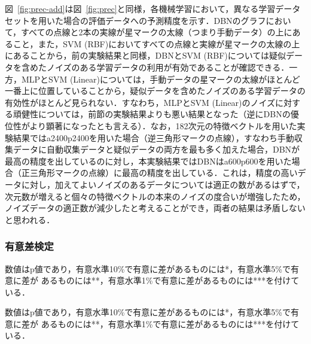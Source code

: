 \documentclass[japanese]{jnlp_1.4}
\begin{document}
図~\ref{fig:prec-add}は図~\ref{fig:prec}と同様，各機械学習において，異なる学習データセットを用いた場合の評価データへの予測精度を示す．DBNのグラフにおいて，すべての点線と2本の実線が星マークの太線（つまり手動データ）の上にあること，また，SVM (RBF)においてすべての点線と実線が星マークの太線の上にあることから，前の実験結果と同様，DBNとSVM (RBF)については疑似データを含めたノイズのある学習データの利用が有効であることが確認できる．一方，MLPとSVM (Linear)については，手動データの星マークの太線がほとんど一番上に位置していることから，疑似データを含めたノイズのある学習データの有効性がほとんど見られない．すなわち，MLPとSVM (Linear)のノイズに対する頑健性については，前節の実験結果よりも悪い結果となった（逆にDBNの優位性がより顕著になったとも言える）．なお，182次元の特徴ベクトルを用いた実験結果ではa2400p2400を用いた場合（逆三角形マークの点線），すなわち手動収集データに自動収集データと疑似データの両方を最も多く加えた場合，DBNが最高の精度を出しているのに対し，本実験結果ではDBNはa600p600を用いた場合（正三角形マークの点線）に最高の精度を出している．これは，精度の高いデータに対し，加えてよいノイズのあるデータについては適正の数があるはずで，次元数が増えると個々の特徴ベクトルの本来のノイズの度合いが増強したため，ノイズデータの適正数が減少したと考えることができ，両者の結果は矛盾しないと思われる．


\subsubsection{有意差検定}

\begin{table}[b]
\vspace{-0.5\Cvs}
\label{tab:test-top1}

\vspace{4pt}\small
数値はp値であり，有意水準10\%で有意に差があるものには*，有意水準5\%で有意に差が
あるものには**，有意水準1\%で有意に差があるものには***を付けている．\par
\end{table}
\begin{table}[b]
\label{tab:test-top10}

\small
数値はp値であり，有意水準10\%で有意に差があるものには*，有意水準5\%で有意に差が
あるものには**，有意水準1\%で有意に差があるものには***を付けている．\par
\end{table}
\end{document}
